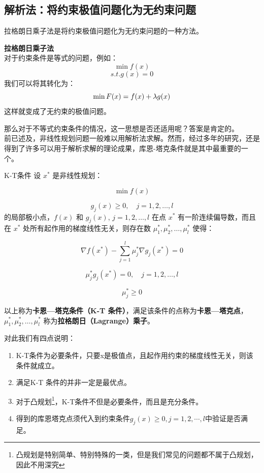 \subsection{解析法：将约束极值问题化为无约束问题}
拉格朗日乘子法是将约束极值问题化为无约束问题的一种方法。\\
\begin{notebox}\textbf{{拉格朗日乘子法}}{}
\\对于约束条件是等式的问题，例如：
$$
\min f(x)
$$
$$
s.t. g(x)=0
$$
我们可以将其转化为：
$$
\min F(x)=f(x) + \lambda g(x)\\
$$
这样就变成了无约束的极值问题。
\end{notebox}
那么对于不等式约束条件的情况，这一思想是否还适用呢？答案是肯定的。\\
前已述及，非线性规划问题一般难以用解析法求解。然而，经过多年的研究，还是得到了许多可以用于解析求解的理论成果，库恩-塔克条件就是其中最重要的一个。
\begin{dfnbox}{K-T条件}{}
设 $x^*$ 是非线性规划：

\[
\min f(x)
\]

\[
g_j(x) \geq 0, \quad j = 1, 2, \dots, l
\]
的局部极小点，$f(x)$ 和 $g_j(x)$, $j = 1, 2, \dots, l$ 在点 $x^*$ 有一阶连续偏导数，而且在 $x^*$ 处所有起作用的梯度线性无关，则存在数 $\mu_1^*, \mu_2^*, \dots, \mu_l^*$ 使得：

\[
\nabla f(x^*) - \sum_{j=1}^{l} \mu_j^* \nabla g_j(x^*) = 0
\]

\[
\mu_j^* g_j(x^*) = 0, \quad j = 1, 2, \dots, l
\]

\[
\mu_j^* \geq 0
\]

以上称为\textbf{卡恩—塔克条件（K-T 条件）}，满足该条件的点称为\textbf{卡恩—塔克点}，$\mu_1^*, \mu_2^*, \dots, \mu_l^*$ 称为\textbf{拉格朗日（Lagrange）乘子}。
\end{dfnbox}
对此我们有四点说明：
\begin{enumerate}
    \item K-T条件为必要条件，只要x是极值点，且起作用约束的梯度线性无关，则该条件就成立。
    \item 满足K-T 条件的并非一定是最优点。
    \item 对于凸规划\footnote{凸规划是特别简单、特别特殊的一类，但是我们常见的问题都不属于凸规划，因此不用深究}，K-T条件不但是必要条件，而且是充分条件。
    \item 得到的库恩塔克点须代入到约束条件$g_j(x)\geq0,j=1,2,\cdots,l$中验证是否满足。
\end{enumerate}
